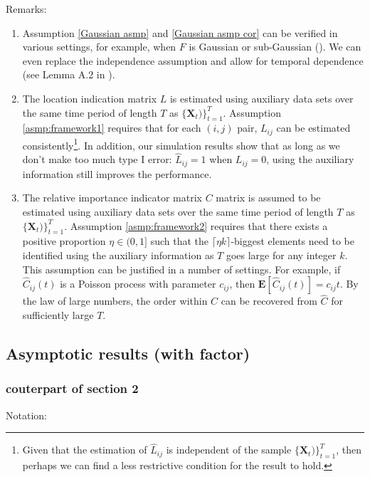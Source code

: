 \vspace{5mm}
Remarks: 
\begin{enumerate}
    \item Assumption \autoref{Gaussian asmp} and \autoref{Gaussian asmp cor} can be verified in various settings, for example, when \(F\) is Gaussian or sub-Gaussian (\cite{cai2011adaptive}). We can even replace the independence assumption and allow for temporal dependence (see Lemma A.2 in \cite{shu2019EstimationLarge}). 
    
    \item The location indication matrix $L$ is estimated using auxiliary data sets over the same time period of length $T$ as $\{\boldsymbol{X}_{t})\}_{t=1}^T$. Assumption \autoref{asmp:framework1} requires that for each \((i,j)\) pair, \(L_{ij}\) can be estimated consistently\footnote{Given that the estimation of \(\hat{L}_{ij}\) is independent of the sample \(\{\boldsymbol{X}_{t})\}_{t=1}^T\), then perhaps we can find a less restrictive condition for the result to hold.}.  In addition, our simulation results show that as long as we don't make too much type I error: \(\hat{L}_{ij} = 1\) when \(L_{ij} = 0\), using the auxiliary information still improves the performance.  
    
    \item The relative importance indicator matrix $C$ matrix is assumed to be estimated using auxiliary data sets over the same time period of length $T$ as $\{\boldsymbol{X}_{t})\}_{t=1}^T$. Assumption \autoref{asmp:framework2} requires that there exists a positive proportion $\eta \in (0, 1]$ such that the $\lceil \eta k \rceil$-biggest elements need to be identified using the auxiliary information as $T$ goes large for any integer $k$. This assumption can be justified in a number of settings. For example, if $\hat{C}_{ij}(t)$ is a Poisson process with parameter $c_{ij}$, then $\mathbf{E} [\hat{C}_{ij}(t)] = c_{ij}t$. By the law of large numbers, the order within $C$ can be recovered from $\hat C$ for sufficiently large $T$.
\end{enumerate}

\subsection{Asymptotic results (with factor)}
\subsubsection{couterpart of section 2 \label{fan2011pca section 2}}
Notation: 

